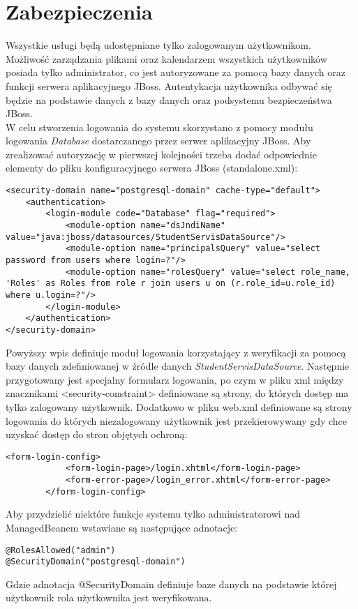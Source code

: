 \section{Zabezpieczenia}
Wszystkie usługi będą udostępniane tylko zalogowanym użytkownikom. Możliwość zarządzania plikami oraz kalendarzem wszystkich użytkowników posiada tylko administrator, co jest autoryzowane za pomocą bazy danych oraz funkcji serwera aplikacyjnego JBoss. Autentykacja użytkownika odbywać się będzie na podstawie danych z bazy danych oraz podsystemu bezpieczeństwa JBoss.\\
W celu stworzenia logowania do systemu skorzystano z pomocy modułu logowania \textit{Database} dostarczanego przez serwer aplikacyjny JBoss. Aby zrealizować autoryzację w pierwszej kolejności trzeba dodać odpowiednie elementy do pliku konfiguracyjnego serwera JBoss (standalone.xml):
\begin{lstlisting}[breaklines=true]
<security-domain name="postgresql-domain" cache-type="default">
	<authentication>
		<login-module code="Database" flag="required">
			<module-option name="dsJndiName" value="java:jboss/datasources/StudentServisDataSource"/>
			<module-option name="principalsQuery" value="select password from users where login=?"/>
			<module-option name="rolesQuery" value="select role_name, 'Roles' as Roles from role r join users u on (r.role_id=u.role_id) where u.login=?"/>
		</login-module>
	</authentication>
</security-domain>
\end{lstlisting}
Powyższy wpis definiuje moduł logowania korzystający z weryfikacji za pomocą bazy danych zdefiniowanej w źródle danych \textit{StudentServisDataSource}. Następnie przygotowany jest specjalny formularz logowania, po czym w pliku xml między znacznikami <security-constraint> definiowane są strony, do których dostęp ma tylko zalogowany użytkownik. Dodatkowo w pliku web.xml definiowane są strony logowania do których niezalogowany użytkownik jest przekierowywany gdy chce uzyskać dostęp do stron objętych ochroną:
\begin{lstlisting}[breaklines=true]
		<form-login-config>
			<form-login-page>/login.xhtml</form-login-page>
			<form-error-page>/login_error.xhtml</form-error-page>
		</form-login-config>
\end{lstlisting}
Aby przydzielić niektóre funkcje systemu tylko administratorowi nad ManagedBeanem wstawiane są następujące adnotacje:
\begin{lstlisting}[breaklines=true]
@RolesAllowed("admin")
@SecurityDomain("postgresql-domain") 
\end{lstlisting} 
Gdzie adnotacja @SecurityDomain definiuje baze danych na podstawie której użytkownik rola użytkownika jest weryfikowana.
